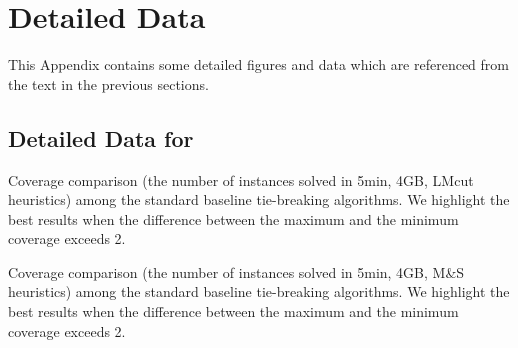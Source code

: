 

\section{Detailed Data}
\label{sec:appendix}

This Appendix contains some detailed figures and data which are referenced from the text in the previous sections. 


\subsection{Detailed Data for }

\begin{table}[htbp]
 {
 \centering
 
 \caption{
 Coverage comparison (the number of instances solved in 5min, 4GB, LMcut
 heuristics) among
 the standard baseline tie-breaking algorithms. We highlight the
 best results when the difference between the maximum and the minimum coverage exceeds 2.
 }
 \label{tbl:lmcut-ipc-std}
 }
\end{table}

\begin{table}[htbp]
 {
 \centering
 
 \caption{
 Coverage comparison (the number of instances solved in 5min, 4GB, M\&S heuristics) among
 the standard baseline tie-breaking algorithms. We highlight the
 best results when the difference between the maximum and the minimum coverage exceeds 2.
 }
 \label{tbl:mands-ipc-std}
 }
\end{table}

%
% 
%  

